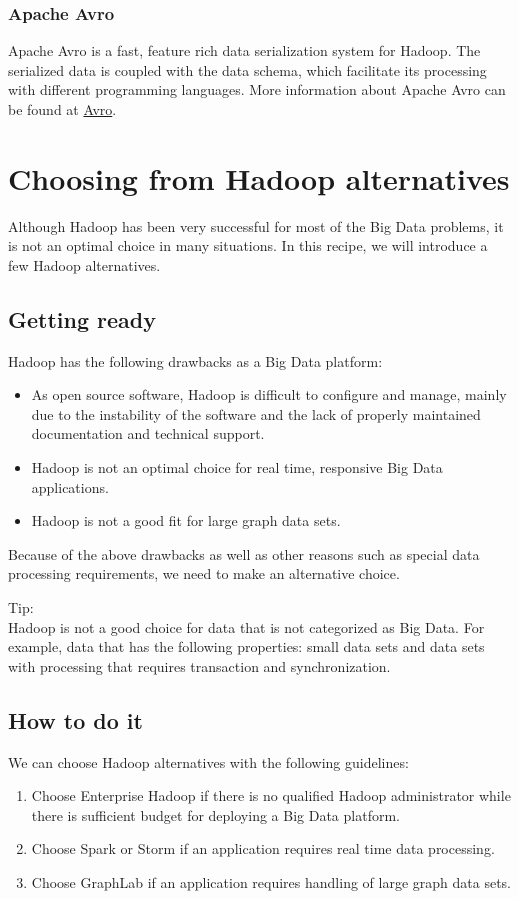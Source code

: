 \subsubsection*{Apache Avro}
Apache Avro is a fast, feature rich data serialization system for Hadoop. The serialized data is coupled with the data schema, which facilitate its processing with different programming languages.  More information about Apache Avro can be found at \href{http://avro.apache.org}{Avro}.
\section{Choosing from Hadoop alternatives}
Although Hadoop has been very successful for most of the Big Data problems, it is not an optimal choice in many situations. In this recipe, we will introduce a few Hadoop alternatives.
\subsection*{Getting ready}
Hadoop has the following drawbacks as a Big Data platform:
\begin{itemize}
  \item As open source software, Hadoop is difficult to configure and manage, mainly due to the instability of the software and the lack of properly maintained documentation and technical support.
  \item Hadoop is not an optimal choice for real time, responsive Big Data applications.
  \item Hadoop is not a good fit for large graph data sets.
\end{itemize}

Because of the above drawbacks as well as other reasons such as special data processing requirements, we need to make an alternative choice.
\begin{info} 
Tip: \\
Hadoop is not a good choice for data that is not categorized as Big Data. For example, data that has the following properties: small data sets and data sets with processing that requires transaction and synchronization.
\end{info} 

\subsection*{How to do it}
We can choose Hadoop alternatives with the following guidelines:
\begin{enumerate}
  \item Choose Enterprise Hadoop if there is no qualified Hadoop administrator while there is sufficient budget for deploying a Big Data platform.
  \item Choose Spark or Storm if an application requires real time data processing.
  \item Choose GraphLab if an application requires handling of large graph data sets.
\end{enumerate}
